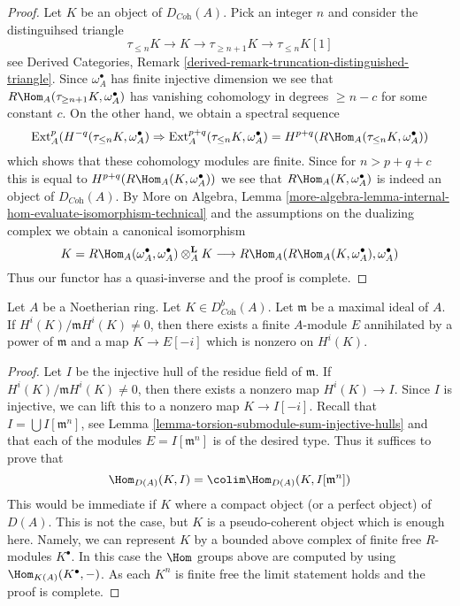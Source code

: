 \begin{proof}
Let $K$ be an object of $D_{\textit{Coh}}(A)$. Pick an integer $n$ and
consider the distinguihsed triangle
$$
\tau_{\leq n}K \to K \to \tau_{\geq n + 1}K \to \tau_{\leq n}K[1]
$$
see Derived Categories, Remark
\ref{derived-remark-truncation-distinguished-triangle}.
Since $\omega_A^\bullet$ has finite injective dimension we see
that $R\Hom_A(\tau_{\geq n + 1}K, \omega_A^\bullet)$ has vanishing
cohomology in degrees $\geq n - c$ for some constant $c$.
On the other hand, we obtain a spectral sequence
$$
\text{Ext}_A^p(H^{-q}(\tau_{\leq n}K, \omega_A^\bullet)
\Rightarrow
\text{Ext}_A^{p + q}(\tau_{\leq n}K, \omega_A^\bullet) =
H^{p + q}(R\Hom_A(\tau_{\leq n}K, \omega_A^\bullet))
$$
which shows that these cohomology modules are finite. Since for
$n > p + q + c$ this is equal to $H^{p + q}(R\Hom_A(K, \omega_A^\bullet))$
we see that $R\Hom_A(K, \omega_A^\bullet)$ is indeed an object
of $D_{\textit{Coh}}(A)$.
By More on Algebra, Lemma
\ref{more-algebra-lemma-internal-hom-evaluate-isomorphism-technical}
and the assumptions on the dualizing complex
we obtain a canonical isomorphism
$$
K = R\Hom_A(\omega_A^\bullet, \omega_A^\bullet) \otimes_A^\mathbf{L} K
\longrightarrow
R\Hom_A(R\Hom_A(K, \omega_A^\bullet), \omega_A^\bullet)
$$
Thus our functor has a quasi-inverse and the proof is complete.
\end{proof}

\begin{lemma}
\label{lemma-detect-cohomology}
Let $A$ be a Noetherian ring. Let $K \in D^b_{\textit{Coh}}(A)$.
Let $\mathfrak m$ be a maximal ideal of $A$.
If $H^i(K)/\mathfrak m H^i(K) \not = 0$, then there exists a finite
$A$-module $E$ annihilated by a power of $\mathfrak m$
and a map $K \to E[-i]$ which is nonzero on $H^i(K)$.
\end{lemma}

\begin{proof}
Let $I$ be the injective hull of the residue field of $\mathfrak m$.
If $H^i(K)/\mathfrak m H^i(K) \not = 0$, then there exists a nonzero
map $H^i(K) \to I$. Since $I$ is injective, we can lift this to a
nonzero map $K \to I[-i]$. Recall that $I = \bigcup I[\mathfrak m^n]$,
see Lemma \ref{lemma-torsion-submodule-sum-injective-hulls}
and that each of the modules $E = I[\mathfrak m^n]$ is of the
desired type. Thus it suffices to prove that
$$
\Hom_{D(A)}(K, I) = \colim \Hom_{D(A)}(K, I[\mathfrak m^n])
$$
This would be immediate if $K$ where a compact object
(or a perfect object) of $D(A)$. This is not the case, but
$K$ is a pseudo-coherent object which is enough here. Namely,
we can represent $K$ by a bounded above complex of finite
free $R$-modules $K^\bullet$. In this case the $\Hom$ groups
above are computed by using $\Hom_{K(A)}(K^\bullet, -)$.
As each $K^n$ is finite free the limit statement holds and the
proof is complete.
\end{proof}

